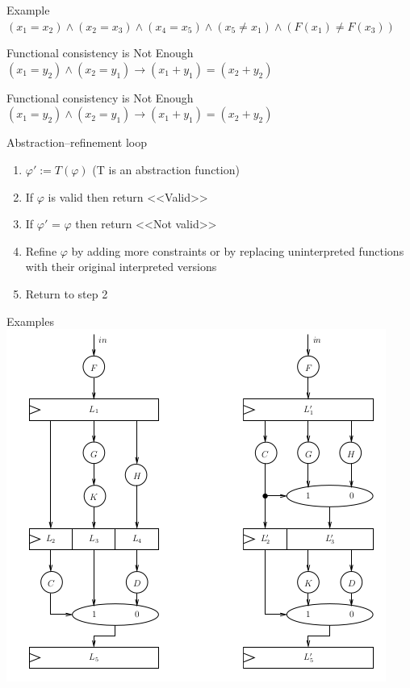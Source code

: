 \documentclass{beamer}
\begin{document}
\begin{frame}{Example}
$(x_1 = x_2) \wedge (x_2 = x_3) \wedge (x_4 = x_5) \wedge (x_5 \neq x_1) \wedge (F(x_1) \neq F(x_3))$
\end{frame}

\begin{frame}{Functional consistency is Not Enough}
$(x_1 = y_2) \wedge (x_2 = y_1) \rightarrow (x_1 + y_1) = (x_2 + y_2)$
\end{frame}

\begin{frame}{Functional consistency is Not Enough}
$(x_1 = y_2) \wedge (x_2 = y_1) \rightarrow (x_1 + y_1) = (x_2 + y_2)$
\begin{block}{Abstraction–refinement loop}
\begin{enumerate}
\item $\varphi' := T(\varphi)$ (T is an abstraction function)
\item If $\varphi$ is valid then return <<Valid>>
\item If $\varphi'$ = $\varphi$ then return <<Not valid>>
\item Refine $\varphi$ by adding more constraints or by replacing uninterpreted functions with their original interpreted versions
\item Return to step 2
\end{enumerate}
\end{block}
\end{frame}

\begin{frame}{Examples}
\includegraphics[scale=0.5]{circuit.png}
\end{frame}
\end{document}
